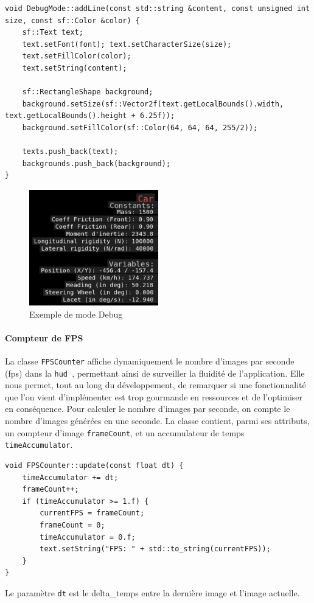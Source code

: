 \begin{lstlisting}[style=CStyle, label={lst:code_addline}]
void DebugMode::addLine(const std::string &content, const unsigned int size, const sf::Color &color) {
    sf::Text text;
    text.setFont(font); text.setCharacterSize(size);
    text.setFillColor(color);
    text.setString(content);

    sf::RectangleShape background;
    background.setSize(sf::Vector2f(text.getLocalBounds().width, text.getLocalBounds().height + 6.25f));
    background.setFillColor(sf::Color(64, 64, 64, 255/2));

    texts.push_back(text);
    backgrounds.push_back(background);
}
\end{lstlisting}
\begin{figure}[H]
    \centering
    \includegraphics[width=0.5\textwidth]{resources/example_debug_mode_1}
    \caption{Exemple de mode Debug}
    \label{fig:debug_mode}
\end{figure}

\paragraph{Compteur de FPS}
La classe \texttt{FPSCounter} affiche dynamiquement le nombre d'images par seconde (\gls{fps}) dans la \texttt{\gls{hud} }, permettant ainsi de surveiller la fluidité de l'application.
Elle nous permet, tout au long du développement, de remarquer si une fonctionnalité que l'on vient d'implémenter est trop gourmande en ressources et de l'optimiser en conséquence.
\textsuper
Pour calculer le nombre d'images par seconde, on compte le nombre d'images générées en une seconde.
La classe contient, parmi ses attributs, un compteur d'image \texttt{frameCount}, et un accumulateur de temps \texttt{timeAccumulator}.
\begin{lstlisting}[style=CStyle, label={lst:code_fpscounter}]
void FPSCounter::update(const float dt) {
    timeAccumulator += dt;
    frameCount++;
    if (timeAccumulator >= 1.f) {
        currentFPS = frameCount;
        frameCount = 0;
        timeAccumulator = 0.f;
        text.setString("FPS: " + std::to_string(currentFPS));
    }
}
\end{lstlisting}
Le paramètre \texttt{dt} est le \gls{delta_temps} entre la dernière image et l'image actuelle.

